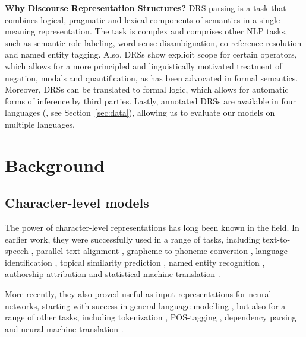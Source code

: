 \documentclass[11pt,a4paper]{article}
\newcommand{\inlineheader}[1]{\vspace{0.06cm}
\noindent\textbf{#1}\quad
}
\begin{document}
\inlineheader{Why Discourse Representation Structures?} DRS parsing is a task that combines logical, pragmatic and lexical components of semantics in a single meaning representation. The task is complex and comprises other NLP tasks, such as semantic role labeling, word sense disambiguation, co-reference resolution and named entity tagging. Also, DRSs show explicit scope for certain operators, which allows for a more principled and linguistically motivated treatment of negation, modals and quantification, as has been advocated in formal semantics.
Moreover, DRSs can be translated to formal logic, which allows for automatic forms of inference by third parties. Lastly, annotated DRSs are available in four languages  (\citealp{eacl:pmb}, see Section~\ref{sec:data}), allowing us to evaluate our models on multiple languages.


\section{Background}
\label{sec:background}

\subsection{Character-level models}
\label{sec:backgroundchar}

The power of character-level representations has long been known in the field. 
In earlier work, they were successfully used in a range of tasks, including
text-to-speech \citep{sejnowski1987parallel}, parallel text alignment \citep{church1993char_align}, grapheme to phoneme conversion \citep{kaplan:94}, language identification \citep{dunning1994statistical}, topical similarity prediction \citep{cavnar1995using}, named entity recognition \citep{klein2003named}, authorship attribution \citep{peng2003language} and statistical machine translation \citep{vilar2007can}.

More recently, they also proved useful as input representations for neural networks, starting with success in general language modelling \citep{sutskever:11,kim2016character,bojanowski2017enriching}, but also for a range of other tasks, including tokenization \citep{evang2013elephant}, POS-tagging \citep{santos2014learning, plank:16}, dependency parsing \citep{ballesteros-etal-2015-improved, vania-etal-2018-character} and neural machine translation \citep{chung-etal-2016-character,costa2016character, luong-manning-2016-achieving, cherry-etal-2018-revisiting}.
\end{document}
